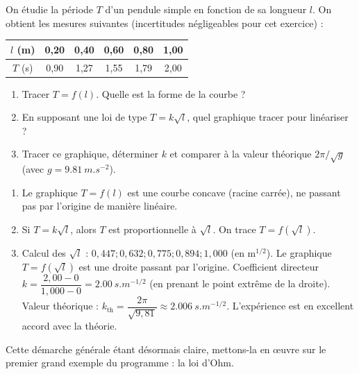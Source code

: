 \documentclass[11pt]{article}
\begin{document}
\begin{exercice}
On étudie la période $T$ d'un pendule simple en fonction de sa longueur $l$. On obtient les mesures suivantes (incertitudes négligeables pour cet exercice) :

\begin{center}
\begin{tabular}{|c|c|c|c|c|c|}\hline
$l$ (m) & 0,20 & 0,40 & 0,60 & 0,80 & 1,00 \\ \hline
$T$ (s) & 0,90 & 1,27 & 1,55 & 1,79 & 2,00 \\ \hline
\end{tabular}
\end{center}

\begin{enumerate}
\item Tracer $T = f(l)$. Quelle est la forme de la courbe ?
\item En supposant une loi de type $T = k \sqrt{l}$, quel graphique tracer pour linéariser ?
\item Tracer ce graphique, déterminer $k$ et comparer à la valeur théorique $2\pi/\sqrt{g}$ (avec $g = \SI{9,81}{m.s^{-2}}$).
\end{enumerate}
\end{exercice}

\begin{corrige}
\begin{enumerate}
\item Le graphique $T = f(l)$ est une courbe concave (racine carrée), ne passant pas par l'origine de manière linéaire.
\item Si $T = k \sqrt{l}$, alors $T$ est proportionnelle à $\sqrt{l}$. On trace $T = f(\sqrt{l})$.
\item Calcul des $\sqrt{l}$ : $0,447 ; 0,632 ; 0,775 ; 0,894 ; 1,000$ (en $\text{m}^{1/2}$).
Le graphique $T = f(\sqrt{l})$ est une droite passant par l'origine.
Coefficient directeur $k = \dfrac{2,00 - 0}{1,000 - 0} = \SI{2,00}{s.m^{-1/2}}$ (en prenant le point extrême de la droite).
Valeur théorique : $k_{\text{th}} = \dfrac{2\pi}{\sqrt{9,81}} \approx \SI{2,006}{s.m^{-1/2}}$.
L'expérience est en excellent accord avec la théorie.
\end{enumerate}
\end{corrige}

Cette démarche générale étant désormais claire, mettons-la en œuvre sur le premier grand exemple du programme : la loi d'Ohm.
\end{document}
